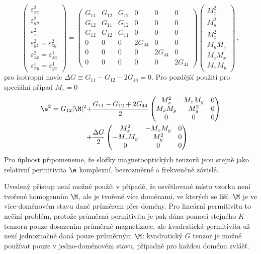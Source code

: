 \begin{equation}
\begin{pmatrix}
\varepsilon^2_{xx} \\ \varepsilon^2_{yy} \\ \varepsilon^2_{zz} \\ \varepsilon^2_{yz}=\varepsilon^2_{zy} \\ \varepsilon^2_{zx}=\varepsilon^1_{xz} \\ \varepsilon^1_{xy}=\varepsilon^1_{yx}\end{pmatrix}
=\begin{pmatrix}
G_{11} & G_{12} & G_{12} & 0 & 0 & 0 \\
G_{12} & G_{11} & G_{12} & 0 & 0 & 0 \\
G_{12} & G_{12} & G_{11} & 0 & 0 & 0 \\
0 & 0 & 0 & 2G_{44} & 0 & 0 \\
0 & 0 & 0 & 0 & 2G_{44} & 0 \\
0 & 0 & 0 & 0 & 0 & 2G_{44} 
\end{pmatrix}\begin{pmatrix}M_x^2 \\ M_y^2 \\ M_z^2 \\ M_y M_z \\ M_z M_x \\ M_x M_y \end{pmatrix} \,,
\end{equation}
pro isotropní navíc $\Delta G \equiv G_{11}-G_{12}-2G_{44}=0$.
Pro pozdější použití pro speciální případ $M_z=0$
\begin{align}
\e^2=
G_{12} |\M|^2 +& \frac{G_{11}-G_{12}+2G_{44}}{2}\begin{pmatrix}
M_x^2 & M_x M_y & 0 \\ M_x M_y & M_y^2 & 0 \\ 0 & 0 & 0
\end{pmatrix}\\
+& \frac{\Delta G}{2} \begin{pmatrix}
M_x^2 & -M_xM_y & 0\\ -M_xM_y & M_y^2 & 0 \\ 0 & 0 & 0
\end{pmatrix}
\end{align}
Pro úplnost připomeneme, že složky magnetooptických tenzorů jsou stejně jako relativní permitivita $\e$ komplexní, bezrozměrné a frekvenčně závislé.

Uvedený přístup není možné použít v případě, že osvětlované místo vzorku není tvořené homogenním $\M$, ale je tvořené více doménami, ve kterých se liší.
$\M$ je ve více-doménovém stavu dané průměrem přes domény.
Pro lineární permitivitu to nečiní problém, protože průměrná permitivita je pak dána pomocí stejného $K$ tenzoru pouze dosazením průměrné magnetizace, ale kvadratická permitivita už není jednoznačně daná pouze průměrným $\M$: kvadratický $G$ tenzor je možné používat pouze v jedno-doménovém stavu, případně pro každou doménu zvlášť.

